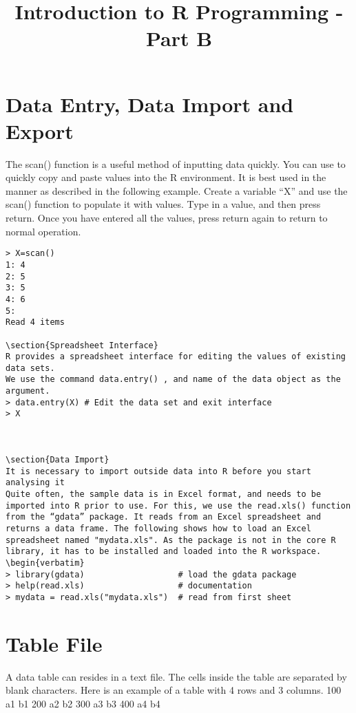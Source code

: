 \documentclass{article}
\title{Introduction to R Programming - Part B}
\date{\vspace{-5ex}}
\begin{document}
\maketitle
\tableofcontents
\section{Data Entry, Data Import and Export}

The scan() function is a useful method of inputting data quickly. You can use to quickly copy and paste values into the R environment.
It is best used in the manner as described in the following example.  Create a variable “X” and use the scan() function to populate it with values.
Type in a value, and then press return.
Once you have entered all the values, press return again to return to normal operation.
\begin{verbatim}
> X=scan()
1: 4
2: 5
3: 5
4: 6
5: 
Read 4 items

\section{Spreadsheet Interface}
R provides a spreadsheet interface for editing the values of existing data sets.
We use the command data.entry() , and name of the data object as the argument.
> data.entry(X) # Edit the data set and exit interface
> X

 

\section{Data Import}
It is necessary to import outside data into R before you start analysing it
Quite often, the sample data is in Excel format, and needs to be imported into R prior to use. For this, we use the read.xls() function from the “gdata” package. It reads from an Excel spreadsheet and returns a data frame. The following shows how to load an Excel spreadsheet named "mydata.xls". As the package is not in the core R library, it has to be installed and loaded into the R workspace.
\begin{verbatim}
> library(gdata)                   # load the gdata package 
> help(read.xls)                   # documentation 
> mydata = read.xls("mydata.xls")  # read from first sheet
\end{verbatim}

\section{Table File}
 A data table can resides in a text file. The cells inside the table are separated by blank characters. Here is an example of a table with 4 rows and 3 columns.
100   a1   b1 
200   a2   b2 
300   a3   b3 
400   a4   b4 
 
\end{document}
